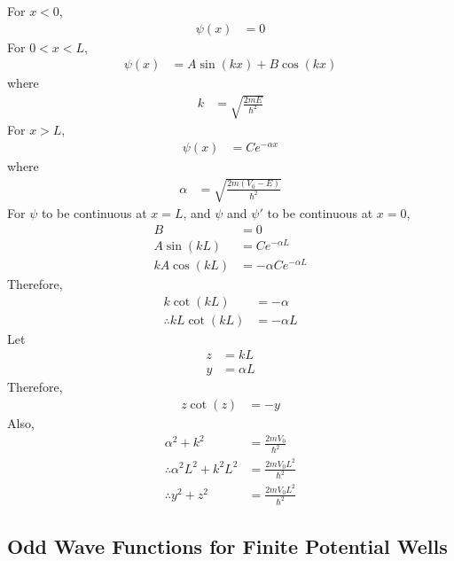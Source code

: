 \documentclass[titlepage, fleqn, a4paper, 12pt, twoside]{article}
\theoremstyle{definition}
\theoremstyle{theorem}
\begin{document}
\begin{solution}
	For $x < 0$,
	\begin{align*}
		\psi(x) &= 0
	\end{align*}
	For $0 < x < L$,
	\begin{align*}
		\psi(x) &= A \sin(k x) + B \cos(k x)
	\end{align*}
	where
	\begin{align*}
		k &= \sqrt{\frac{2 m E}{\hbar^2}}
	\end{align*}
	For $x > L$,
	\begin{align*}
		\psi(x) &= C e^{-\alpha x}
	\end{align*}
	where
	\begin{align*}
		\alpha &= \sqrt{\frac{2 m (V_0 - E)}{\hbar^2}}
	\end{align*}
	For $\psi$ to be continuous at $x = L$, and $\psi$ and $\psi'$ to be continuous at $x = 0$,
	\begin{align*}
		B &= 0\\
		A \sin(k L) &= C e^{-\alpha L}\\
		k A \cos(k L) &= -\alpha C e^{-\alpha L}
	\end{align*}
	Therefore,
	\begin{align*}
		k \cot(k L) &= -\alpha\\
		\therefore k L \cot(k L) &= -\alpha L
	\end{align*}
	Let
	\begin{align*}
		z &= k L\\
		y &= \alpha L
	\end{align*}
	Therefore,
	\begin{align*}
		z \cot(z) &= -y
	\end{align*}
	Also,
	\begin{align*}
		\alpha^2 + k^2 &= \frac{2 m V_0}{\hbar^2}\\
		\therefore \alpha^2 L^2 + k^2 L^2 &= \frac{2 m V_0 L^2}{\hbar^2}\\
		\therefore y^2 + z^2 &= \frac{2 m V_0 L^2}{\hbar^2}
	\end{align*}
\end{solution}

\subsection{Odd Wave Functions for Finite Potential Wells}
\end{document}
